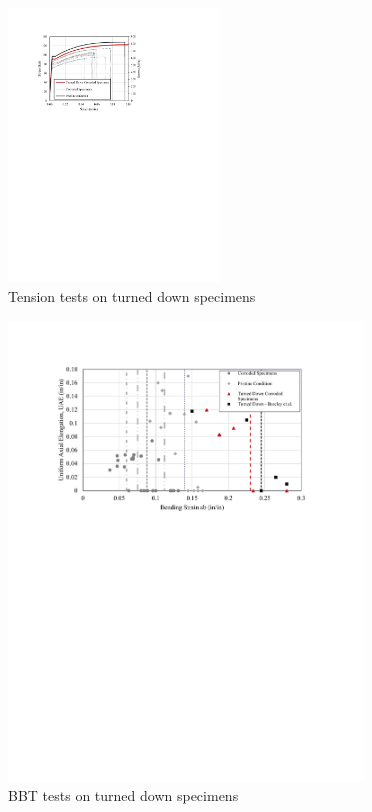\begin{figure}[htbp]
	\centering
	\includegraphics[width=0.5\textwidth]{VAC Thesis 2.0/Chapter-4/figs/TensionTest_TurnedDown.pdf}
	\caption{Tension tests on turned down specimens}
	\label{fig:TurnedDown_tension_tests}
\end{figure}

\begin{figure}[htbp]
	\centering
	\includegraphics[width=0.84\textwidth]{VAC Thesis 2.0/Chapter-4/figs/Results_BBT_TurnedDown.pdf}
	\caption{BBT tests on turned down specimens}
	\label{fig:TurnedDown_BBT_tests}
\end{figure}

